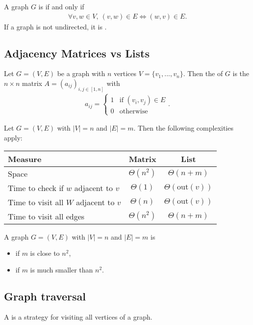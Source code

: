 \documentclass{article}
\begin{document}
\begin{definition}
	A graph $G$ is  if and only if
	\begin{align*}
		\forall v,w\in V,\: (v,w)\in E \Leftrightarrow (w,v)\in E.
	\end{align*}
	If a graph is not undirected, it is .
\end{definition}

\subsection{Adjacency Matrices vs Lists}

\begin{definition}
	Let $G=(V,E)$ be a graph with $n$ vertices $V=\{v_1, ..., v_n\}$.
	Then the  of $G$ is the $n\times n$ matrix
	$A=(a_{ij})_{i,j\in[1,n]}$ with 
	\begin{align*}
		a_{ij} = \begin{cases}
			1 &\text{if } (v_i,v_j)\in E\\
			0 &\text{otherwise}
		\end{cases}.
	\end{align*}
\end{definition}

\begin{theorem}
	Let $G=(V,E)$ with $|V|=n$ and $|E|=m$. Then the following 
	complexities apply:
	\begin{center}
	\begin{tabular}{| l | c | c |}
		\hline
		 Measure & Matrix & List\\
		\hline
		Space & $\Theta(n^2)$ & $\Theta(n+m)$ \\
		\hline
		Time to check if $w$ adjacent to $v$ & $\Theta(1)$ & $\Theta(\text{out}(v))$\\
		\hline
		Time to visit all $W$ adjacent to $v$ & $\Theta(n)$ & $\Theta(\text{out}(v))$\\
		\hline
		Time to visit all edges & $\Theta(n^2)$ & $\Theta(n+m)$\\
		\hline
	\end{tabular}
\end{center}
\begin{lemma}
	A graph $G=(V,E)$ with $|V|=n$ and $|E|=m$ is
	\begin{itemize}
		\item {} if $m$ is close to $n^2$,
		\item {} if $m$ is much smaller than $n^2$. 
	\end{itemize}
\end{lemma}
\end{theorem}

\subsection{Graph traversal}

\begin{definition}
	A  is a strategy for visiting all vertices of a graph.
\end{definition} 
\end{document}
